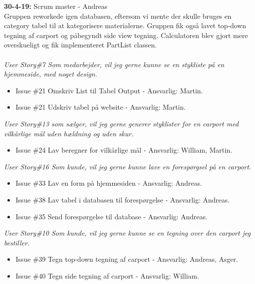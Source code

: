 \documentclass[11pt]{report}
\begin{document}
\noindent\textbf{30-4-19:} Scrum master - Andreas\\
Gruppen reworkede igen databasen, eftersom vi mente der skulle bruges en category tabel til at kategorisere materialerne. Gruppen fik også lavet top-down tegning af carport og påbegyndt side view tegning. Calculatoren blev gjort mere overskueligt og fik implementeret PartList classen.\\\\
\textit{User Story\#7 Som medarbejder, vil jeg gerne kunne se en stykliste på en hjemmeside, med noget design.}
\begin{itemize}
\renewcommand\labelitemi{--}
\item Issue \#21 Omskriv List til Tabel Output - Ansvarlig: Martin.
\item Issue \#21 Udskriv tabel på website - Ansvarlig: Martin.
\end{itemize}
\textit{User Story\#13 som sælger, vil jeg gerne generer styklister for en carport med vilkårlige mål uden hældning og uden skur.}
\begin{itemize}
\item Issue \#24 Lav beregner for vilkårlige mål - Ansvarlig: William, Martin.
\end{itemize}
\textit{User Story\#16 Som kunde, vil jeg gerne kunne lave en forespørgsel på en carport.}
\begin{itemize}
\renewcommand\labelitemi{--}
\item Issue \#33 Lav en form på hjemmesiden - Ansvarlig: Andreas.
\item Issue \#38 Lav tabel i databasen til forespørgelse - Ansvarlig: Andreas.
\item Issue \#35 Send forespørgelse til database - Ansvarlig: Andreas.
\end{itemize}
\textit{User Story\#10 Som kunde, vil jeg gerne kunne se en tegning over den carport jeg bestiller.}
\begin{itemize}
\renewcommand\labelitemi{--}
\item Issue \#39 Tegn top-down tegning af carport - Ansvarlig: Andreas, Asger.
\item Issue \#40 Tegn side tegning af carport - Ansvarlig: William.
\end{itemize}
\end{document}
